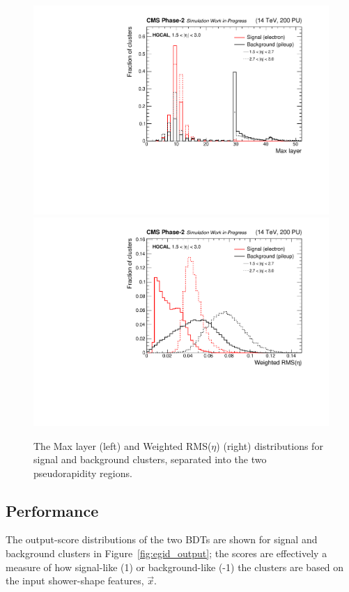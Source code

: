 \begin{figure}
  \centering
  \includegraphics[width=.49\textwidth]{Figures/cms/egid/cl3d_maxlayer.pdf}
  \includegraphics[width=.49\textwidth]{Figures/cms/egid/cl3d_seetot.pdf}
  \caption[$e/\gamma$ identification input feature distributions]
  {
    The Max layer (left) and Weighted RMS($\eta$) (right) distributions for signal and background clusters, separated into the two pseudorapidity regions.
  }
  \label{fig:egid_features}
\end{figure}

\subsection{Performance}
The output-score distributions of the two BDTs are shown for signal and background clusters in Figure~\ref{fig:egid_output}; the scores are effectively a measure of how signal-like (1) or background-like (-1) the clusters are based on the input shower-shape features, $\vec{x}$. 


